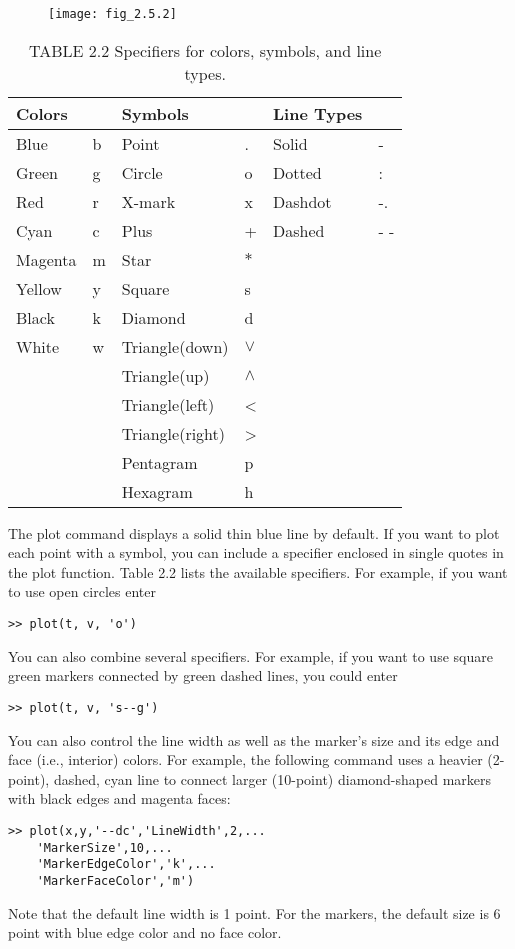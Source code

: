 \documentclass[../main.tex]{subfiles}
\begin{document}
\begin{figure}[H]
	\centering
	\texttt{[image: fig\_2.5.2]}
   
\end{figure}

\begin{table}[H]
	\caption*{TABLE 2.2 Specifiers for colors, symbols, and line types.}
	\centering
	\begin{tabular}{l l l l l l }
		\hline

		Colors && Symbols&& Line Types&\\
		\hline
		Blue& b  &Point &.  &Solid& -\\
		Green& g& Circle& o&  Dotted& :\\
		Red& r &X-mark &x &Dashdot& -.\\
		Cyan &c &Plus &+ &Dashed& - -\\
		Magenta &m &Star& $ \ast $&&\\
		Yellow& y& Square& s&& \\
		Black& k &Diamond& d&& \\
		White& w &Triangle(down)& $\vee$ && \\
		&&Triangle(up) &$\wedge$ && \\
		&&Triangle(left)& <&& \\
		&&Triangle(right) &>&& \\
		&&Pentagram& p&& \\
		&&Hexagram& h&& \\
		\hline
	\end{tabular}	
\end{table}


The plot command displays a solid thin blue line by default. If you want to plot each
point with a symbol, you can include a specifier enclosed in single quotes in the plot 
function. Table 2.2 lists the available specifiers. For example, if you want to use open circles enter
\begin{lstlisting}[frame=none, numbers=none]
	>> plot(t, v, 'o')
\end{lstlisting}
You can also combine several specifiers. For example, if you want to use square green
markers connected by green dashed lines, you could enter
\begin{lstlisting}[frame=none, numbers=none]
	>> plot(t, v, 's--g')
\end{lstlisting}
You can also control the line width as well as the marker’s size and its edge and face (i.e.,
interior) colors. For example, the following command uses a heavier (2-point), dashed,
cyan line to connect larger (10-point) diamond-shaped markers with black edges and
magenta faces:
\begin{lstlisting}[frame=none, numbers=none]
	>> plot(x,y,'--dc','LineWidth',2,...
	'MarkerSize',10,...
	'MarkerEdgeColor','k',...
	'MarkerFaceColor','m')
\end{lstlisting}
Note that the default line width is 1 point. For the markers, the default size is 6 point with
blue edge color and no face color.
\end{document}
